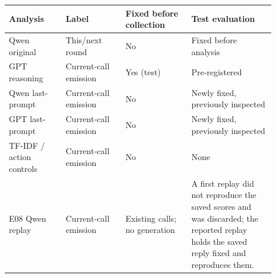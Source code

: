 \begin{tabular}{@{}>{\raggedright\arraybackslash}p{0.19\linewidth}>{\raggedright\arraybackslash}p{0.2\linewidth}>{\raggedright\arraybackslash}p{0.22\linewidth}>{\raggedright\arraybackslash}p{0.28\linewidth}@{}}
\toprule
Analysis & Label & Fixed before collection & Test evaluation \\
\midrule
Qwen original & This/next round & No & Fixed before analysis \\
GPT reasoning & Current-call emission & Yes (test) & Pre-registered \\
Qwen last-prompt & Current-call emission & No & Newly fixed, previously inspected \\
GPT last-prompt & Current-call emission & No & Newly fixed, previously inspected \\
TF-IDF / action controls & Current-call emission & No & None \\
E08 Qwen replay & Current-call emission & Existing calls; no generation & A first replay did not reproduce the saved scores and was discarded; the reported replay holds the saved reply fixed and reproduces them. \\
\bottomrule
\end{tabular}
